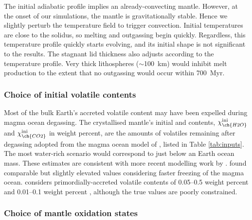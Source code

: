 The initial adiabatic profile implies an already-convecting mantle. However, at the onset of our simulations, the mantle is gravitationally stable. Hence we slightly perturb the temperature field to trigger convection. Initial temperatures are close to the solidus, so melting and outgassing begin quickly.
Regardless, this temperature profile quickly starts evolving, and its initial shape is not significant to the results. The stagnant lid thickness also adjusts according to the temperature profile. Very thick lithospheres ($\sim$100~km) would inhibit melt production to the extent that no outgassing would occur within 700~Myr. 




\subsubsection{Choice of initial volatile contents}


Most of the bulk Earth's accreted volatile content may have been expelled during magma ocean degassing. The crystallised mantle's initial  and  contents, $\chi_{\ch{H2O}}^{\rm ini}$ and $\chi_{\ch{CO2}}^{\rm ini}$ in weight percent, are the amounts of volatiles remaining after degassing adopted from the magma ocean model of \citet{elkins-tanton_linked_2008}, listed in Table \ref{tab:inputs}. The most water-rich scenario would correspond to just below an Earth ocean mass. These estimates are consistent with more recent modelling work by \citet{barth_magma_2021}. \citet{Hiermajunder2017} found comparable but slightly elevated values considering faster freezing of the magma ocean. \citet{elkins-tanton_linked_2008} considers primordially-accreted volatile contents of 0.05--0.5 weight percent  and 0.01--0.1 weight percent , although the true values are poorly constrained. 


\subsubsection{Choice of mantle oxidation states}\label{sec:redox}

